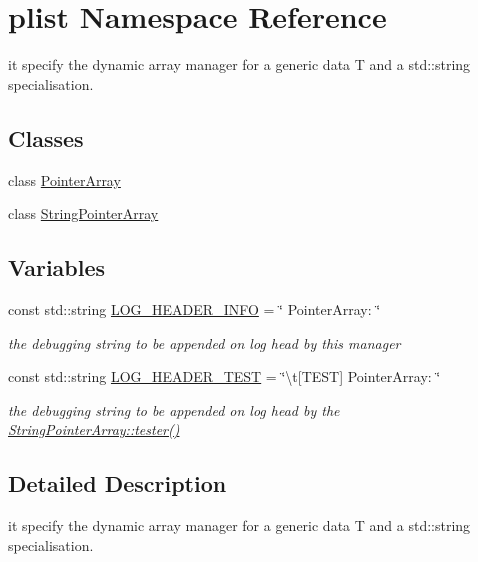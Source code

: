 \hypertarget{namespaceplist}{\section{plist Namespace Reference}
\label{namespaceplist}
}


it specify the dynamic array manager for a generic data T and a std\-::string specialisation.  


\subsection*{Classes}
\begin{DoxyCompactItemize}
\item 
class \hyperlink{classplist_1_1PointerArray}{Pointer\-Array}
\item 
class \hyperlink{classplist_1_1StringPointerArray}{String\-Pointer\-Array}
\end{DoxyCompactItemize}
\subsection*{Variables}
\begin{DoxyCompactItemize}
\item 
\hypertarget{namespaceplist_ade7054997b9398e8849aeeb49fec64be}{const std\-::string \hyperlink{namespaceplist_ade7054997b9398e8849aeeb49fec64be}{L\-O\-G\-\_\-\-H\-E\-A\-D\-E\-R\-\_\-\-I\-N\-F\-O} = \char`\"{} Pointer\-Array\-: \char`\"{}}\label{namespaceplist_ade7054997b9398e8849aeeb49fec64be}

\begin{DoxyCompactList}\small\item\em the debugging string to be appended on log head by this manager \end{DoxyCompactList}\item 
\hypertarget{namespaceplist_a3885f5631d2861bb122fa7c38af01b6d}{const std\-::string \hyperlink{namespaceplist_a3885f5631d2861bb122fa7c38af01b6d}{L\-O\-G\-\_\-\-H\-E\-A\-D\-E\-R\-\_\-\-T\-E\-S\-T} = \char`\"{}\textbackslash{}t\mbox{[}T\-E\-S\-T\mbox{]} Pointer\-Array\-: \char`\"{}}\label{namespaceplist_a3885f5631d2861bb122fa7c38af01b6d}

\begin{DoxyCompactList}\small\item\em the debugging string to be appended on log head by the \hyperlink{classplist_1_1StringPointerArray_ab27123144831936be6c1d19f1613ef50}{String\-Pointer\-Array\-::tester()} \end{DoxyCompactList}\end{DoxyCompactItemize}


\subsection{Detailed Description}
it specify the dynamic array manager for a generic data T and a std\-::string specialisation. 